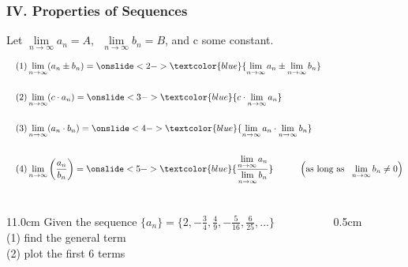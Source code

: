 \begin{frame}
\frametitle{IV. Properties of Sequences}
\scriptsize

Let $\lim \limits_{n \to \infty} a_n = A$, $\,\,\lim \limits_{n \to \infty} b_n = B$, and c some constant.

\begin{align*}
\quad &(1) \lim \limits_{n \to \infty} (a_n \pm b_n) = \onslide<2->{\textcolor{blue}{\lim \limits_{n \to \infty} a_n \pm \lim \limits_{n \to \infty} b_n}}  \\
&\\
\quad &(2) \lim \limits_{n \to \infty} (c \cdot a_n) = \onslide<3->{\textcolor{blue}{c \cdot \lim \limits_{n \to \infty} a_n}} \\
&\\
\quad &(3) \lim \limits_{n \to \infty} (a_n \cdot b_n) = \onslide<4->{\textcolor{blue}{\lim \limits_{n \to \infty} a_n \cdot \lim \limits_{n \to \infty} b_n}} \\
&\\
\quad &(4) \lim \limits_{n \to \infty} \left(\frac{a_n}{b_n}\right) = \onslide<5->{\textcolor{blue}{\frac{\lim \limits_{n \to \infty} a_n}{\lim \limits_{n \to \infty} b_n}}} \hspace{1.0cm} \left(\text{as long as } \,\, \lim \limits_{n \to \infty} b_n \ne 0\right)
\end{align*}

\vspace{0.5cm}


\end{frame}

\begin{frame}
\frametitle{}
\scriptsize

\vspace{0.2cm}

\begin{columns}
\begin{column}{11.0cm}
Given the sequence $\displaystyle{\{a_n\} = \{ 2, -\frac{3}{4}, \frac{4}{9}, -\frac{5}{16},\frac{6}{25}, ...\}}$\\
\vspace{0.2cm}
(1) find the general term \\
\vspace{0.2cm}
(2) plot the first 6 terms \\ 

\vspace{10.5cm}

\end{column}
\begin{column}{0.5cm}
	
\end{column}
\end{columns}
\end{frame}

